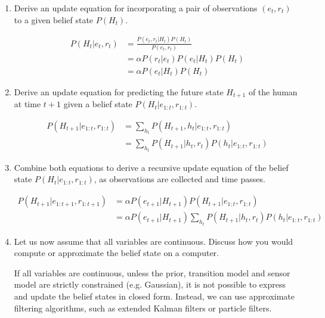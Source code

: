 \documentclass[11pt, a4paper]{article}
\begin{document}
\begin{enumerate}
    \item Derive an update equation for incorporating a pair of observations $(e_t, r_t)$ to a given belief state $P(H_t)$.

    \begin{solution}
        \begin{align*}
            P(H_t | e_t, r_t) & = \frac{P(e_t, r_t | H_t) P(H_t)}{P(e_t, r_t)} \\
            & = \alpha P(r_t | e_t) P(e_t | H_t) P(H_t) \\
            & = \alpha P(e_t | H_t) P(H_t)
        \end{align*}
    \end{solution}

    \item Derive an update equation for predicting the future state $H_{t+1}$ of the human at time $t+1$ given a belief state $P(H_t | e_{1:t}, r_{1:t})$.

    \begin{solution}
        \begin{align*}
            P(H_{t+1} | e_{1:t}, r_{1:t}) & = \sum_{h_t} P(H_{t+1}, h_t | e_{1:t}, r_{1:t}) \\
            & = \sum_{h_t} P(H_{t+1} | h_t, r_t) P(h_t | e_{1:t}, r_{1:t})
        \end{align*}
    \end{solution}

    \item Combine both equations to derive a recursive update equation of the belief state $P(H_t | e_{1:t}, r_{1:t})$, as observations are collected and time passes.

    \begin{solution}
        \begin{align*}
            P(H_{t+1} | e_{1:t+1}, r_{1:t+1}) & = \alpha P(e_{t+1} | H_{t+1}) P(H_{t+1} | e_{1:t}, r_{1:t}) \\
            & = \alpha P(e_{t+1} | H_{t+1}) \sum_{h_t} P(H_{t+1} | h_t, r_t) P(h_t | e_{1:t}, r_{1:t})
        \end{align*}
    \end{solution}

    \item Let us now assume that all variables are continuous. Discuss how you would compute or approximate the belief state on a computer.

    \begin{solution}
        If all variables are continuous, unless the prior, transition model and sensor model are strictly constrained (e.g. Gaussian), it is not possible to express and update the belief states in closed form. Instead, we can use approximate filtering algorithms, such as extended Kalman filters or particle filters.
    \end{solution}
\end{enumerate}
\end{document}
